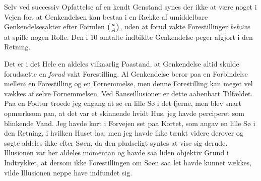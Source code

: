 \documentclass[12pt,a4paper,openany]{book}
\begin{document}
Selv ved successiv Opfattelse af en kendt Genstand synes der ikke at være noget
i Vejen for, at Genkendelsen kan bestaa i en Række af umiddelbare
Genkendelsesakter efter Formlen $\left({a\atop A}\right)$, uden at forud vakte
Forestillinger \emph{behøve} at spille nogen Rolle. Den i 10 omtalte indbildte
Genkendelse peger afgjort i den Retning.

Det er i det Hele en aldeles vilkaarlig Paastand, at Genkendelse altid skulde
forudsætte en \emph{forud} vakt Forestilling. Al Genkendelse beror paa en
Forbindelse mellem en Forestilling og en Fornemmelse, men denne Forestilling
kan meget vel vækkes af selve Fornemmelsen. Ved Sanseillusioner er dette
aabenbart Tilfældet. Paa en Fodtur troede jeg engang at se en lille Sø i det
fjerne, men blev snart opmærksom paa, at det var et skinnende hvidt Hus, jeg
havde perciperet som blinkende Vand. Jeg havde kort i Forvejen set paa Kortet,
som angav en lille Sø i den Retning, i hvilken Huset laa; men jeg havde ikke
tænkt videre derover og søgte aldeles ikke efter Søen, da den pludseligt syntes
at vise sig derude. Illusionen var her aldeles momentan og havde saa liden
objektiv Grund i Indtrykket, at dersom ikke Forestillingen om Søen saa let
havde kunnet vækkes, vilde Illusionen neppe have indfundet sig.
\end{document}
